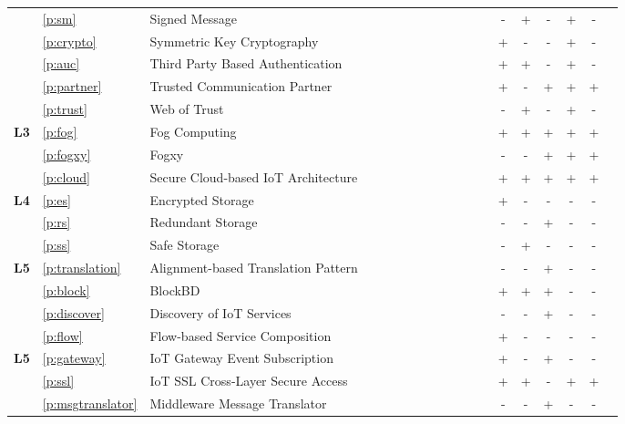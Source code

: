 \begin{landscape}
\begin{longtable}[c]{lllcccccccccccccccc}
	& \ref{p:sm} & Signed Message & & & & & & & \checkmark & & & & - & + & - & + & - \\
	& \ref{p:crypto} & Symmetric Key Cryptography & & & & & & & \checkmark & & & & + & - & - & + & - \\
	& \ref{p:auc} & Third Party Based Authentication & & & & & & & \checkmark & & & & + & + & - & + & - \\
	& \ref{p:partner} & Trusted Communication Partner & & & & & & \checkmark & \checkmark & & & & + & - & + & + & + \\
	& \ref{p:trust} & Web of Trust & & & & & & & \checkmark & & & & - & + & - & + & - \\
	\hline
	\multirow{3}{*}{\textbf{L3}} & \ref{p:fog} & Fog Computing & & \checkmark & \checkmark & & & & \checkmark & & & & + & + & + & + & + \\ 
	& \ref{p:fogxy} & Fogxy & & \checkmark & \checkmark & & & & \checkmark & & & & - & - & + & + & + \\ 
	& \ref{p:cloud} & Secure Cloud-based IoT Architecture & & & \checkmark & & & & \checkmark & & & & + & + & + & + & + \\
	\hline
	\multirow{3}{*}{\textbf{L4}} & \ref{p:es} & Encrypted Storage & & & & & & \checkmark & \checkmark & & & & + & - & - & - & - \\
	& \ref{p:rs} & Redundant Storage & & & & & & & \checkmark & & & & - & - & + & - & - \\
	& \ref{p:ss} & Safe Storage & & & & & & \checkmark & \checkmark & & & & - & + & - & - & - \\
	\hline
	\multirow{4}{*}{\textbf{L5}} & \ref{p:translation} & Alignment-based Translation Pattern & & & \checkmark & & & & & & & & - & - & + & - & - \\
	& \ref{p:block} & BlockBD & & & \checkmark & & & & \checkmark & & & & + & + & + & - & - \\
	& \ref{p:discover} & Discovery of IoT Services & & & \checkmark & & & & & & & & - & - & + & - & - \\
	& \ref{p:flow} & Flow-based Service Composition & & \checkmark & & & & & \checkmark & & & & + & - & - & - & - \\ 
	\hline
	\multirow{8}{*}{\textbf{L5}} & \ref{p:gateway} & IoT Gateway Event Subscription & & & \checkmark & & & & \checkmark & & & & + & - & + & - & - \\
	& \ref{p:ssl} & IoT SSL Cross-Layer Secure Access & & & \checkmark & & & & & & & & + & + & - & + & + \\
	& \ref{p:msgtranslator} & Middleware Message Translator & & & \checkmark & & & & & & & & - & - & + & - & - \\

\end{longtable}
\end{landscape}
